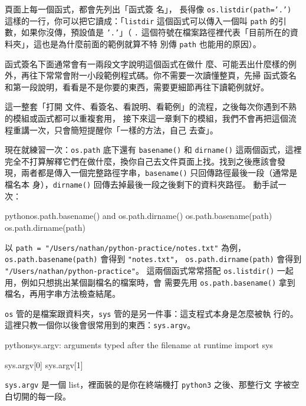 頁面上每一個函式，都會先列出「函式簽
名」，
長得像 \texttt{os.listdir(path='.')} 這樣的一行，你可以把它讀成：「\texttt{listdir}
這個函式可以傳入一個叫 \texttt{path} 的引數，如果你沒傳，預設值是 \texttt{'.'}」（
\texttt{.} 這個符號在檔案路徑裡代表「目前所在的資料夾」，這也是為什麼前面的範例就算不特
別傳 \texttt{path} 也能用的原因）。

函式簽名下面通常會有一兩段文字說明這個函式在做什
麼、可能丟出什麼樣的例外，再往下常常會附一小段範例程式碼。你不需要一次讀懂整頁，先掃
函式簽名和第一段說明，看看是不是你要的東西，需要更細節再往下讀範例就好。

這一整套「打開
文件、看簽名、看說明、看範例」的流程，之後每次你遇到不熟的模組或函式都可以重複套用，
接下來這一章剩下的模組，我們不會再把這個流程重講一次，只會簡短提醒你「一樣的方法，自己
去查」。

現在就練習一次：\texttt{os.path} 底下還有 \texttt{basename()} 和 \texttt{dirname()}
這兩個函式，這裡完全不打算解釋它們在做什麼，換你自己去文件頁面上找。找到之後應該會發
現，兩者都是傳入一個完整路徑字串，\texttt{basename()} 只回傳路徑最後一段（通常是檔名本
身），\texttt{dirname()} 回傳去掉最後一段之後剩下的資料夾路徑。
動手試一次：

\begin{code}{python}{os.path.basename() and os.path.dirname()}
os.path.basename(path)
os.path.dirname(path)
\end{code}

以 \texttt{path = "/Users/nathan/python-practice/notes.txt"} 為例，
\texttt{os.path.basename(path)} 會得到 \texttt{"notes.txt"}，
\texttt{os.path.dirname(path)} 會得到 \texttt{"/Users/nathan/python-practice"}。
這兩個函式常常搭配 \texttt{os.listdir()} 一起用，例如只想挑出某個副檔名的檔案時，會
需要先用 \texttt{os.path.basename()} 拿到檔名，再用字串方法檢查結尾。

\texttt{os} 管的是檔案跟資料夾，\texttt{sys} 管的是另一件事：這支程式本身是怎麼被執
行的。這裡只教一個你以後會很常用到的東西：\texttt{sys.argv}。

\begin{code}{python}{sys.argv: arguments typed after the filename at runtime}
import sys

sys.argv[0]
sys.argv[1]
\end{code}

\texttt{sys.argv} 是一個 list，裡面裝的是你在終端機打 \texttt{python3} 之後、那整行文
字被空白切開的每一段。

